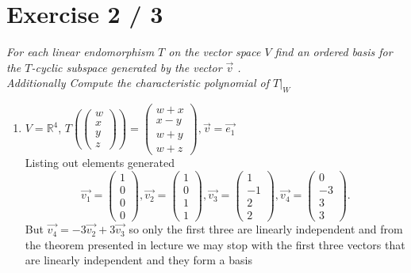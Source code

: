 \documentclass{article}
\begin{document}
    \section{Exercise 2 / 3}
    \emph{
        For each linear endomorphism $T$ on the vector space
        $V$ find an ordered basis for the $T$-cyclic subspace generated by the vector
        $\vec{v}$ .\\
        Additionally Compute the characteristic polynomial of $T|_W$
    }
    \begin{enumerate}
        \item $V = \mathbb{R}^{4}$, $T(\begin{pmatrix} w \\ x \\ y \\ z \end{pmatrix} ) = \begin{pmatrix} w + x \\ x-y \\ w+y\\ w+z \end{pmatrix} , \vec{v} = \vec{e_1}$\\
            Listing out elements generated
            \[
            \vec{v_1} = \begin{pmatrix} 1 \\ 0 \\ 0 \\ 0 \end{pmatrix} ,\vec{v_2} =  \begin{pmatrix} 1 \\ 0 \\ 1 \\ 1 \end{pmatrix} , \vec{v_3} = \begin{pmatrix} 1 \\ -1 \\ 2 \\ 2 \end{pmatrix},\vec{v_4} =  \begin{pmatrix} 0 \\ -3 \\ 3 \\ 3 \end{pmatrix} 
            .\] 
            But $\vec{v_4} = -3\vec{v_2} + 3\vec{v_3}$ so only the first three are
            linearly independent and from the theorem presented in lecture we may stop with the first three
            vectors that are linearly independent and they form a basis\\

\end{enumerate}
\end{document}
